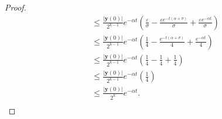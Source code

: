 \documentclass[11pt,oneside,english]{amsart}
\theoremstyle{definition}
\newcommand{\ve}{\varepsilon}
\begin{document}
\begin{enumerate}
\begin{proof}
\begin{align*}
&\leq\frac{|\mathbf{y}(0)|}{2^{k-1}}e^{-\alpha t}\left(\frac{\ve}{\sigma}-\frac{\ve e^{-t(\alpha +\sigma)}}{\sigma}+\frac{\ve e^{-\alpha t}}{\sigma}\right)\\[2mm]
&\leq\frac{|\mathbf{y}(0)|}{2^{k-1}}e^{-\alpha t}\left(\frac{1}{4}-\frac{e^{-t(\alpha +\sigma)}}{4}+\frac{ e^{-\alpha t}}{4}\right)\\[2mm]
&\leq\frac{|\mathbf{y}(0)|}{2^{k-1}}e^{-\alpha t}\left(\frac{1}{4}-\frac{1}{4}+\frac{1}{4}\right)\\[2mm]
&\leq\frac{|\mathbf{y}(0)|}{2^{k-1}}e^{-\alpha t}\left(\frac{1}{4}\right)\\[2mm]
&\leq\frac{|\mathbf{y}(0)|}{2^{k}}e^{-\alpha t}.\\[2mm]
\end{align*}
\end{proof}


\end{enumerate}
\end{document}
